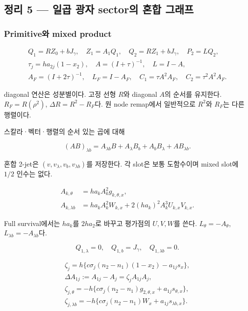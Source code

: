 \hypertarget{uxc815uxb9ac-5-uxc77cuxacf1-uxad11uxc790-sectoruxc758-uxd63cuxd569-uxadf8uxb798uxd504}{%
\subsection{정리 5 --- 일곱 광자 sector의 혼합
그래프}\label{uxc815uxb9ac-5-uxc77cuxacf1-uxad11uxc790-sectoruxc758-uxd63cuxd569-uxadf8uxb798uxd504}}

\hypertarget{primitiveuxc640-mixed-product}{%
\subsubsection{Primitive와 mixed
product}\label{primitiveuxc640-mixed-product}}

\[
\begin{gathered}
Q_1=RZ_0+bJ_\gamma,\quad Z_1=A_1Q_1,\quad
Q_2=RZ_1+bJ_\gamma,\quad P_2=LQ_2,\\
\tau_j=ha_{2j}(1-x_2),\quad
A=(I+\tau)^{-1},\quad L=I-A,\\
A_F=(I+2\tau)^{-1},\quad L_F=I-A_F,\quad
C_1=\tau A^2A_F,\quad C_2=\tau^2A^2A_F.
\end{gathered}
\tag{18.33}
\]

diagonal 연산은 성분별이다. 고정 선형 \(R\)와 diagonal \(A\)의 순서를
유지한다. \(R_F=R(\rho^2)\), \(\Delta R=R^2-R_F\)다. 원 node remap에서
일반적으로 \(R^2\)와 \(R_F\)는 다른 행렬이다.

스칼라·벡터·행렬의 순서 있는 곱에 대해

\[
(AB)_{\lambda b}
=A_{\lambda b}B+A_\lambda B_b
+A_bB_\lambda+AB_{\lambda b}.
\tag{18.34}
\]

혼합 2-jet은 \((v,v_\lambda,v_b,v_{\lambda b})\)를 저장한다. 각 slot은
보통 도함수이며 mixed slot에 \(1/2\) 인수는 없다.

\[
\begin{aligned}
A_{k,\theta}&=ha_kA_k^2 g_{k,\theta,x},\\
A_{k,\lambda b}
&=ha_kA_k^2W_{k,x}
+2(ha_k)^2A_k^3U_{k,x}V_{k,x}.
\end{aligned}
\tag{18.35}
\]

Full survival에서는 \(ha_k\)를 \(2ha_2\)로 바꾸고 평가점의 \(U,V,W\)를
쓴다. \(L_\theta=-A_\theta\), \(L_{\lambda b}=-A_{\lambda b}\)다.

\[
Q_{1,\lambda}=0,\quad Q_{1,b}=J_\gamma,\quad
Q_{1,\lambda b}=0.
\tag{18.36}
\]

\[
\begin{gathered}
\zeta_j=h\{c\sigma_j(n_2-n_1)(1-x_2)-a_{1j}s_x\},\\
\Delta A_{1j}:=A_{1j}-A_j=\zeta_jA_{1j}A_j,\\
\zeta_{j,\theta}
=-h\{c\sigma_j(n_2-n_1)g_{2,\theta,x}+a_{1j}s_{\theta,x}\},\\
\zeta_{j,\lambda b}
=-h\{c\sigma_j(n_2-n_1)W_x+a_{1j}s_{\lambda b,x}\}.
\end{gathered}
\tag{18.37}
\]

